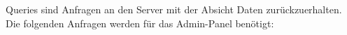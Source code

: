 Queries sind Anfragen an den Server mit der Absicht Daten zurückzuerhalten.
Die folgenden Anfragen werden für das Admin-Panel benötigt: